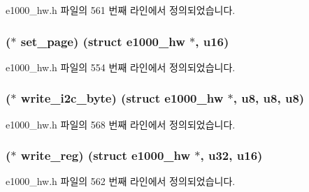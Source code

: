 e1000\+\_\+hw.\+h 파일의 561 번째 라인에서 정의되었습니다.

\subsubsection[{\texorpdfstring{set\+\_\+page}{set_page}}]{($\ast$ set\+\_\+page) (struct {\bf e1000\+\_\+hw} $\ast$, {\bf u16})}\hypertarget{structe1000__phy__operations_a891054739d07decd52a06100c6fbbd61}{}\label{structe1000__phy__operations_a891054739d07decd52a06100c6fbbd61}


e1000\+\_\+hw.\+h 파일의 554 번째 라인에서 정의되었습니다.

\subsubsection[{\texorpdfstring{write\+\_\+i2c\+\_\+byte}{write_i2c_byte}}]{($\ast$ write\+\_\+i2c\+\_\+byte) (struct {\bf e1000\+\_\+hw} $\ast$, {\bf u8}, {\bf u8}, {\bf u8})}\hypertarget{structe1000__phy__operations_a89ea2eace6a337da0420dcaea019fbcb}{}\label{structe1000__phy__operations_a89ea2eace6a337da0420dcaea019fbcb}


e1000\+\_\+hw.\+h 파일의 568 번째 라인에서 정의되었습니다.

\subsubsection[{\texorpdfstring{write\+\_\+reg}{write_reg}}]{($\ast$ write\+\_\+reg) (struct {\bf e1000\+\_\+hw} $\ast$, {\bf u32}, {\bf u16})}\hypertarget{structe1000__phy__operations_a00dd285f09f84ed5253d2900fd0d8abc}{}\label{structe1000__phy__operations_a00dd285f09f84ed5253d2900fd0d8abc}


e1000\+\_\+hw.\+h 파일의 562 번째 라인에서 정의되었습니다.

